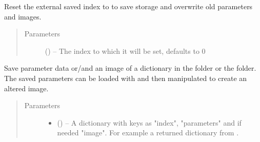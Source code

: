\documentclass[letterpaper,10pt,english]{sphinxmanual}
\begin{document}
\begin{fulllineitems}
\begin{fulllineitems}
\end{fulllineitems}


\begin{fulllineitems}
\label{\detokenize{index:dataset.dataset_cuboids.reset_index}}
Reset the external saved index to  to save storage and overwrite old parameters and images.
\begin{quote}\begin{description}
\item[{Parameters}] \leavevmode
{} (\sphinxstyleliteralemphasis{\sphinxupquote{, }}) -- The index to which it will be set, defaults to 0

\end{description}\end{quote}

\end{fulllineitems}


\begin{fulllineitems}
\label{\detokenize{index:dataset.dataset_cuboids.save}}
Save parameter data or/and an image of a dictionary in the  folder or the  folder. The saved parameters can be loaded with {\hyperref[\detokenize{index:dataset.dataset_cuboids.load_parameters}]{}} and then manipulated to create an altered image.
\begin{quote}\begin{description}
\item[{Parameters}] \leavevmode\begin{itemize}
\item {} 
 () -- A dictionary with keys as "index", "parameters" and if needed "image". For example a returned dictionary from {\hyperref[\detokenize{index:dataset.dataset_cuboids.parameters_to_finished_data}]{}}.


\end{itemize}
\end{description}
\end{quote}
\end{fulllineitems}
\end{fulllineitems}
\end{document}
